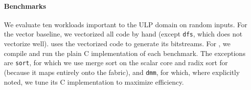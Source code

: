 \paragraph{Benchmarks}
We evaluate ten workloads important to the ULP domain on random inputs.
% 
For the vector baseline, we vectorized all code by hand (except {\tt dfs}, which does not 
vectorize well).
% 
\snafu uses the vectorized code to generate its bitstreams.
% 
For \riptide, we compile and run the plain C implementation of each benchmark.
%
The exceptions are {\tt sort}, for which we use merge sort on the scalar core and
radix sort for \riptide (because it maps entirely onto the fabric),
and {\tt dmm}, for which, where explicitly noted, we tune its C implementation to maximize efficiency.
% 


